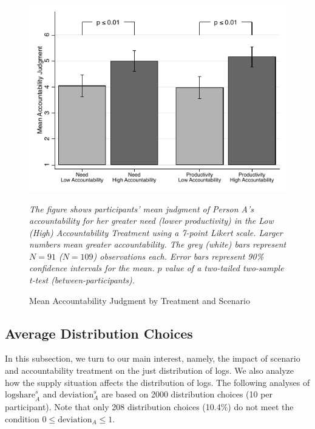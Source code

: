 \documentclass[smallcondensed]{svjour3}
\begin{document}
\begin{figure}[ht!]
   \centering
   \includegraphics[scale=0.7]{figures/main_accountability.pdf}
   \begin{minipage}{10cm}
   \footnotesize
   \emph{The figure shows participants' mean judgment of Person A's accountability for her greater need (lower productivity) in the Low (High) Accountability Treatment using a 7-point Likert scale. Larger numbers mean greater accountability. The grey (white) bars represent $N=91$ ($N=109$) observations each. Error bars represent 90\% confidence intervals for the mean. $p$ value of a two-tailed two-sample t-test (between-participants).}
   \caption{Mean Accountability Judgment by Treatment and Scenario}
   \label{fig:responsibility}
   \end{minipage}
\end{figure}
%
\subsection{Average Distribution Choices}\label{sec:distribution}
%
In this subsection, we turn to our main interest, namely, the impact of scenario and accountability treatment on the just distribution of logs. We also analyze how the supply situation affects the distribution of logs. The following analyses of $\mbox{logshare}_A^s$ and $\mbox{deviation}_A^s$ are based on 2000 distribution choices (10 per participant). Note that only 208 distribution choices (10.4\%) do not meet the condition $0\le\mbox{deviation}_A\le1$.\par
%
\end{document}
